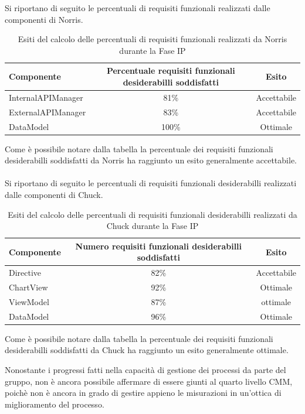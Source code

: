 
Si riportano di seguito le percentuali di requisiti funzionali realizzati dalle componenti di Norris.
\begin{table}[H]
	\centering
		\begin{tabu}{| l | c | c |}
			\hline
			Componente	& Percentuale requisiti funzionali desiderabilli soddisfatti	& Esito		\\ \hline \hline
			InternalAPIManager	& 81\% 	& Accettabile  \\ \hline
			ExternalAPIManager  & 	83\%	& Accettabile  \\ \hline
			DataModel  & 	100\%	& Ottimale  \\ \hline
		\end{tabu}
	\caption{Esiti del calcolo delle percentuali di requisiti funzionali realizzati da Norris durante la Fase IP}
\end{table}
Come è possibile notare dalla tabella la percentuale dei requisiti funzionali desiderabilli soddisfatti da Norris ha raggiunto un esito generalmente accettabile. 
\\ \\
Si riportano di seguito le percentuali di requisiti funzionali desiderabilli realizzati dalle componenti di Chuck.
\begin{table}[H]
	\centering
		\begin{tabu}{| l | c | c |}
			\hline
			Componente	& Numero requisiti funzionali desiderabilli soddisfatti	& Esito		\\ \hline \hline
			Directive	& 82\% 	& Accettabile  \\ \hline
			ChartView  & 	92\%	& Ottimale  \\ \hline
			ViewModel  & 	87\%	& ottimale  \\ \hline
			DataModel  & 	96\%	& Ottimale  \\ \hline
		\end{tabu}
	\caption{Esiti del calcolo delle percentuali di requisiti funzionali desiderabilli realizzati da Chuck durante la Fase IP}
\end{table}
Come è possibile notare dalla tabella la percentuale dei requisiti funzionali desiderabilli soddisfatti da Chuck ha raggiunto un esito generalmente ottimale.



	Nonostante i progressi fatti nella capacità di gestione dei processi da parte del gruppo, non è ancora possibile affermare di essere giunti al quarto livello CMM, poichè non è ancora in grado di gestire appieno le misurazioni in un'ottica di miglioramento del processo.

